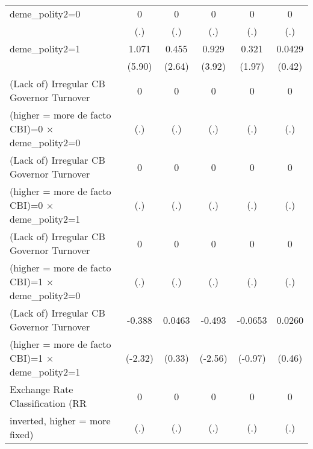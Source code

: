 \begin{table}[htbp]
\begin{tabular}{l*{5}{c}}
\addlinespace
deme\_polity2=0                          &        0         &        0         &        0         &        0         &        0         \\
                                        &      (.)         &      (.)         &      (.)         &      (.)         &      (.)         \\
\addlinespace
deme\_polity2=1                          &    1.071\sym{***}&    0.455\sym{**} &    0.929\sym{***}&    0.321         &   0.0429         \\
                                        &   (5.90)         &   (2.64)         &   (3.92)         &   (1.97)         &   (0.42)         \\
\addlinespace
(Lack of) Irregular CB Governor Turnover&        0         &        0         &        0         &        0         &        0         \\
(higher = more de facto CBI)=0 $\times$ deme\_polity2=0&      (.)         &      (.)         &      (.)         &      (.)         &      (.)         \\
\addlinespace
(Lack of) Irregular CB Governor Turnover&        0         &        0         &        0         &        0         &        0         \\
(higher = more de facto CBI)=0 $\times$ deme\_polity2=1&      (.)         &      (.)         &      (.)         &      (.)         &      (.)         \\
\addlinespace
(Lack of) Irregular CB Governor Turnover&        0         &        0         &        0         &        0         &        0         \\
(higher = more de facto CBI)=1 $\times$ deme\_polity2=0&      (.)         &      (.)         &      (.)         &      (.)         &      (.)         \\
\addlinespace
(Lack of) Irregular CB Governor Turnover&   -0.388\sym{*}  &   0.0463         &   -0.493\sym{*}  &  -0.0653         &   0.0260         \\
(higher = more de facto CBI)=1 $\times$ deme\_polity2=1&  (-2.32)         &   (0.33)         &  (-2.56)         &  (-0.97)         &   (0.46)         \\
\addlinespace
Exchange Rate Classification (RR        &        0         &        0         &        0         &        0         &        0         \\
inverted, higher = more fixed)          &      (.)         &      (.)         &      (.)         &      (.)         &      (.)         \\

\end{tabular}
\end{table}
